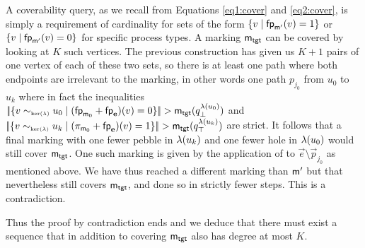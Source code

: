 \begin{proofE}
  A coverability query, as we recall from Equations \eqref{eq1:cover} and \eqref{eq2:cover},
  is simply a requirement of cardinality for sets of the form $\{v \mid \mathsf{fp}_{\mathsf{m}'}(v) = 1\}$
  or $\{v \mid \mathsf{fp}_{\mathsf{m}'}(v) = 0\}$ for specific process types.
  A marking $\mathsf{m}_\mathsf{tgt}$ can be covered by looking at $K$ such vertices.
  The previous construction has given us $K+1$ pairs of one vertex of each of
  these two sets, so there is at least one path where both endpoints are
  irrelevant to the marking,
  in other words one path $p_{j_0}$ from $u_0$ to $u_k$
  where in fact the inequalities
  $|\!|{{\{ {v \sim_{\scriptscriptstyle{\mathrm{ker}(\lambda)}} u_0 \mid (\mathsf{fp}_{\mathsf{m}_0} + \mathsf{fp}_{\mathbf{e}})(v) = 0} \}}}|\!| > \mathsf{m}_\mathsf{tgt}(q^{\lambda(u_0)}_\bot)$
  and
  $|\!|{{\{ {v \sim_{\scriptscriptstyle{\mathrm{ker}(\lambda)}} u_k \mid (\pi_{\mathsf{m}_0} + \mathsf{fp}_{\mathbf{e}})(v) = 1} \}}}|\!| > \mathsf{m}_\mathsf{tgt}(q^{\lambda(u_k)}_\top)$
  are strict.
  It follows that a final marking with one fewer pebble in $\lambda(u_k)$ and one fewer hole in $\lambda(u_0)$
  would still cover $\mathsf{m}_\mathsf{tgt}$.
  One such marking is given by the application of 
  to $\vec{e} \setminus \vec{p}_{j_0}$ as mentioned above.
  We have thus reached a different marking than $\mathsf{m}'$ but that nevertheless
  still covers $\mathsf{m}_\mathsf{tgt}$, and done so in strictly fewer steps.
  This is a contradiction.

  Thus the proof by contradiction ends and we deduce that there must exist
  a sequence that in addition to covering $\mathsf{m}_\mathsf{tgt}$ also has degree at most $K$.
\end{proofE}




